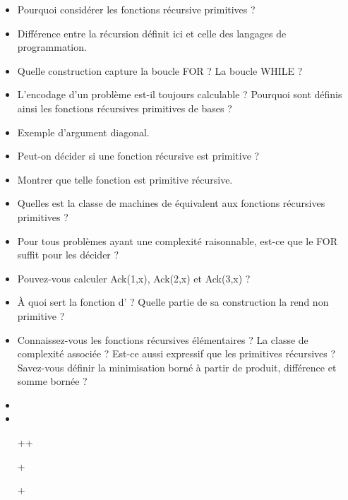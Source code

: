 \documentclass{agregfiche}
\begin{document}
\begin{itemize}
	\item Pourquoi considérer les fonctions récursive primitives ? %
	\item Différence entre la récursion définit ici et celle des langages de programmation.
    \item Quelle construction capture la boucle FOR ? La boucle WHILE 
    ?
	\item L'encodage d'un problème est-il toujours calculable ? 
	Pourquoi sont définis ainsi les fonctions récursives primitives 
	de bases ?
	\item Exemple d'argument diagonal.
    \item Peut-on décider si une fonction récursive est primitive ?
	\item Montrer que telle fonction est primitive récursive.
    \item Quelles est la classe de machines de  équivalent aux fonctions récursives primitives ? %
    \item Pour tous problèmes ayant une complexité raisonnable, 
    est-ce que le FOR suffit pour les décider ?	
\item Pouvez-vous calculer Ack(1,x), Ack(2,x) et Ack(3,x) ?
\item À quoi sert la fonction d' ? Quelle partie de sa 
construction la rend non primitive ?
\item Connaissez-vous les fonctions récursives élémentaires ? La 
classe de complexité associée ? Est-ce aussi expressif que les 
primitives récursives ?
Savez-vous définir la minimisation borné à partir de produit, 
différence et somme bornée ?

\end{itemize}

\secreferences

\begin{itemize}
\item 
\item 
\end{itemize}

\secdev

\begin{itemize}
    \item[++]  
    \item[+] 
    \item[+] 
\end{itemize}
\end{document}
